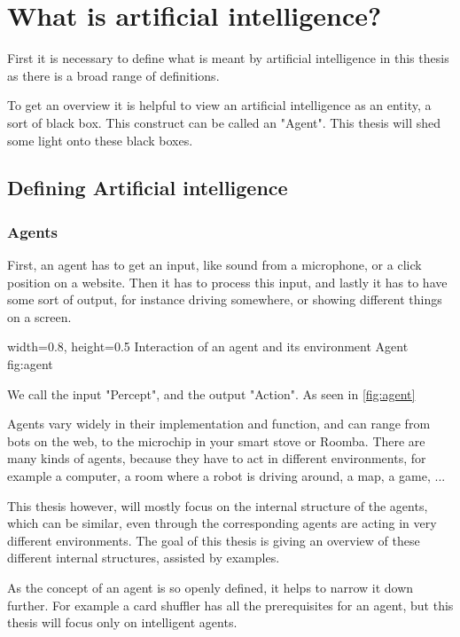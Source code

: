 \chapter{What is artificial intelligence?}
First it is necessary to define what is meant by artificial intelligence in this thesis as there is a broad range of definitions.%

To get an overview it is helpful to view an artificial intelligence as an entity, a sort of black box. This construct can be called an "Agent". 
This thesis will shed some light onto these black boxes.

\section{Defining Artificial intelligence}
\subsection{Agents}
First, an agent has to get an input, like sound from a microphone, or a click position on a website.
Then it has to process this input, and lastly it has to have some sort of output, for instance driving somewhere, or showing different things on a screen.

    {width=0.8\textwidth, height=0.5\textheight} %
    {Interaction of an agent and its environment}   %
    {Agent}   %
    {fig:agent}    %

We call the input "Percept", and the output "Action". As seen in \autoref{fig:agent}

Agents vary widely in their implementation and function, and can range from bots on the web, to the microchip in your smart stove or Roomba. 
There are many kinds of agents, because they have to act in different environments, for example a computer, a room where a robot is driving around, a map, a game, ...

This thesis however, will mostly focus on the internal structure of the agents, which can be similar, even through the corresponding agents are acting in very different environments.
The goal of this thesis is giving an overview of these different internal structures, assisted by examples.

As the concept of an agent is so openly defined, it helps to narrow it down further. For example a card shuffler has all the prerequisites for an agent, but this thesis will focus only on intelligent agents.

